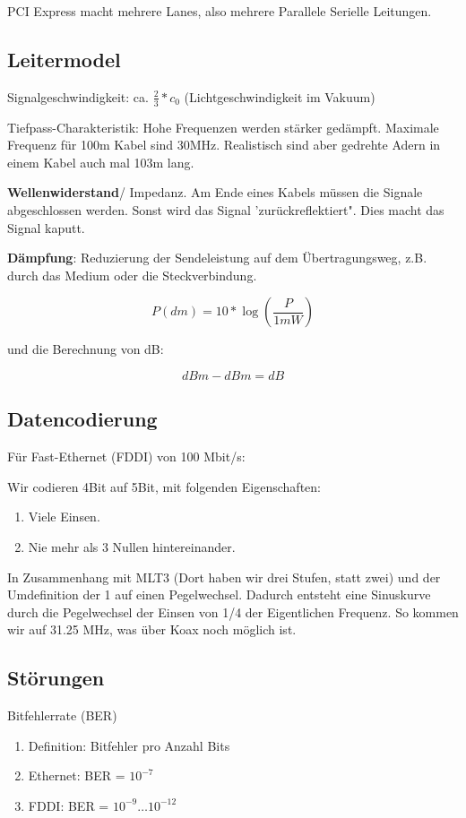 \documentclass[a4paper]{article}
\begin{document}
PCI Express macht mehrere Lanes, also mehrere Parallele Serielle Leitungen.

\subsection{Leitermodel}

Signalgeschwindigkeit: ca. $\frac{2}{3} * c_0$ (Lichtgeschwindigkeit im Vakuum)

Tiefpass-Charakteristik: Hohe Frequenzen werden stärker gedämpft. Maximale Frequenz für 100m Kabel sind 30MHz. Realistisch sind aber gedrehte Adern in einem Kabel auch mal 103m lang.

\textbf{Wellenwiderstand}/ Impedanz. Am Ende eines Kabels müssen die Signale abgeschlossen werden. Sonst wird das Signal 'zurückreflektiert". Dies macht das Signal kaputt.

\textbf{Dämpfung}: Reduzierung der Sendeleistung auf dem Übertragungsweg, z.B. durch das Medium oder die Steckverbindung.

\[
P(dm) = 10*\log(\frac{P}{1 mW})
\]

und die Berechnung von dB:

\[
dBm - dBm = dB
\]

\subsection{Datencodierung}

Für Fast-Ethernet (FDDI) von 100 Mbit/s:

Wir codieren 4Bit auf 5Bit, mit folgenden Eigenschaften:

\begin{enumerate}
    \item Viele Einsen.
    \item Nie mehr als 3 Nullen hintereinander.
\end{enumerate}

In Zusammenhang mit MLT3 (Dort haben wir drei Stufen, statt zwei) und der Umdefinition der 1 auf einen Pegelwechsel. Dadurch entsteht eine Sinuskurve durch die Pegelwechsel der Einsen von 1/4 der Eigentlichen Frequenz. So kommen wir auf 31.25 MHz, was über Koax noch möglich ist.

\subsection{Störungen}

Bitfehlerrate (BER)

\begin{enumerate}
    \item Definition: Bitfehler pro Anzahl Bits
    \item Ethernet: BER = $10^{-7}$
    \item FDDI: BER = $10^{-9}\dots10^{-12}$
\end{enumerate}
\end{document}
